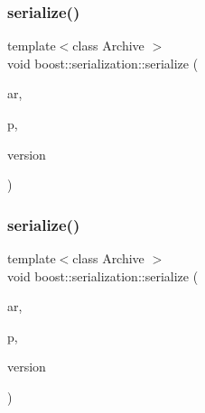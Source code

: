\mbox{\label{namespaceboost_1_1serialization_a7b255d9449f6f4f7b5e3ca7c054cb2c3}} 
\subsubsection{\texorpdfstring{serialize()}{serialize()}\hspace{0.1cm}{\footnotesize\ttfamily [5/6]}}
{\footnotesize\ttfamily template$<$class Archive $>$ \\
void boost\+::serialization\+::serialize (\begin{DoxyParamCaption}\item[{Archive \&}]{ar,  }\item[{N\+T\+L\+::vec\+\_\+\+Z\+Z\+\_\+p \&}]{p,  }\item[{const unsigned int}]{version }\end{DoxyParamCaption})}

\mbox{\label{namespaceboost_1_1serialization_a62de9ba81b8b564ae450120250a7d597}} 
\subsubsection{\texorpdfstring{serialize()}{serialize()}\hspace{0.1cm}{\footnotesize\ttfamily [6/6]}}
{\footnotesize\ttfamily template$<$class Archive $>$ \\
void boost\+::serialization\+::serialize (\begin{DoxyParamCaption}\item[{Archive \&}]{ar,  }\item[{Crypto\+P\+P\+::\+Sec\+Byte\+Block \&}]{p,  }\item[{const unsigned int}]{version }\end{DoxyParamCaption})}


